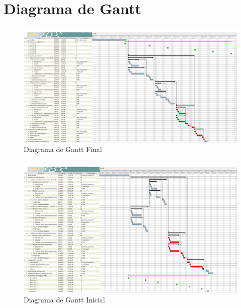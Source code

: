 \chapter{Diagrama de Gantt} \label{cap:ganttanex}

\begin{landscape}
	\begin{figure}
		\includegraphics[width=\linewidth]{Gantt.png}
		\caption{Diagrama de Gantt Final}
		\label{fig:gantt}
	\end{figure}
\end{landscape}

\begin{landscape}
	\begin{figure}
		\includegraphics[width=\linewidth]{Gantt_ini.png}
		\caption{Diagrama de Gantt Inicial}
		\label{fig:ganttini}
	\end{figure}
\end{landscape}

